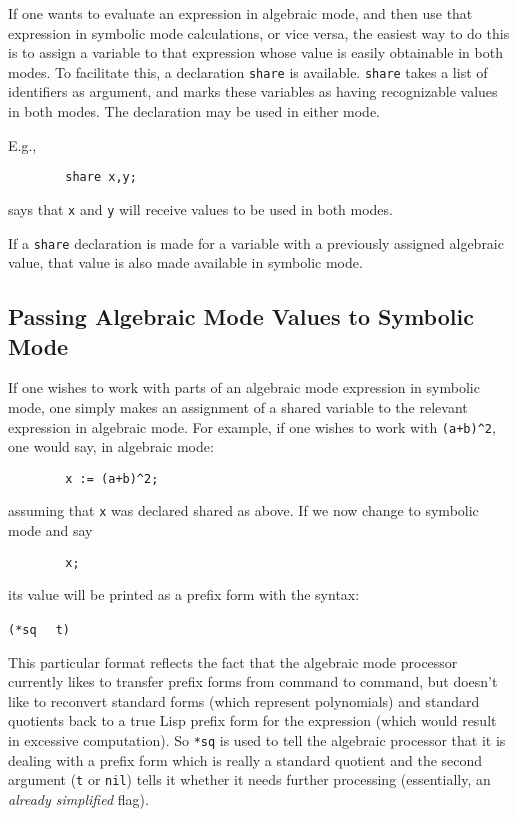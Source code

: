 If one wants to evaluate an expression in algebraic mode, and then use
that expression in symbolic mode calculations, or vice versa, the easiest
way to do this is to assign a variable to that expression whose value is
easily obtainable in both modes.  To facilitate this, a declaration
\texttt{share} is available. \texttt{share} takes a list of
identifiers as argument, and marks these variables as having recognizable
values in both modes.  The declaration may be used in either mode.

E.g.,
\begin{verbatim}
        share x,y;
\end{verbatim}
says that \texttt{x} and \texttt{y} will receive values to be used in both modes.

If a \texttt{share} declaration is made for a variable with a previously
assigned algebraic value, that value is also made available in symbolic
mode.

\subsection{Passing Algebraic Mode Values to Symbolic Mode}

If one wishes to work with parts of an algebraic mode
 expression in symbolic mode,
one simply makes an assignment of a shared variable to
the relevant expression in algebraic mode.  For example, if one wishes to
work with \texttt{(a+b)\textasciicircum 2}, one would say, in algebraic mode:
\begin{verbatim}
        x := (a+b)^2;
\end{verbatim}
assuming that \texttt{x} was declared shared as above.  If we now change to
symbolic mode and say
\begin{verbatim}
        x;
\end{verbatim}
its value will be printed as a prefix form with the syntax:
\begin{syntax}
        \texttt{(*sq }  \texttt{ t)}
\end{syntax}
This particular format reflects the fact that the algebraic mode processor
currently likes to transfer prefix forms from command to command, but
doesn't like to reconvert standard forms (which
represent polynomials) and standard quotients back to a true Lisp prefix
form for the expression (which would result in excessive computation).  So
\texttt{*sq} is used to tell the algebraic processor that it is dealing with
a prefix form which is really a standard quotient and the second argument (\texttt{t} or \texttt{nil}) tells it whether
it needs further processing (essentially, an \emph{already simplified}
flag).

